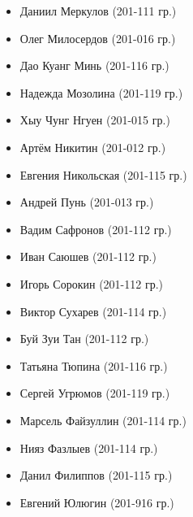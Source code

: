 \begin{itemize}
	\item Даниил Меркулов (201-111 гр.)
	\item Олег Милосердов (201-016 гр.)
	\item Дао Куанг Минь (201-116 гр.)
	\item Надежда Мозолина (201-119 гр.)
	\item Хыу Чунг Нгуен (201-015 гр.)
	\item Артём Никитин (201-012 гр.)
	\item Евгения Никольская (201-115 гр.)
	\item Андрей Пунь (201-013 гр.)
	\item Вадим Сафронов (201-112 гр.)
	\item Иван Саюшев (201-112 гр.)
	\item Игорь Сорокин (201-112 гр.)
	\item Виктор Сухарев (201-114 гр.)
	\item Буй Зуи Тан (201-112 гр.)
	\item Татьяна Тюпина (201-116 гр.)
	\item Сергей Угрюмов (201-119 гр.)
	\item Марсель Файзуллин (201-114 гр.)
	\item Нияз Фазлыев (201-114 гр.)
	\item Данил Филиппов (201-115 гр.)
	\item Евгений Юлюгин (201-916 гр.)
\end{itemize}
